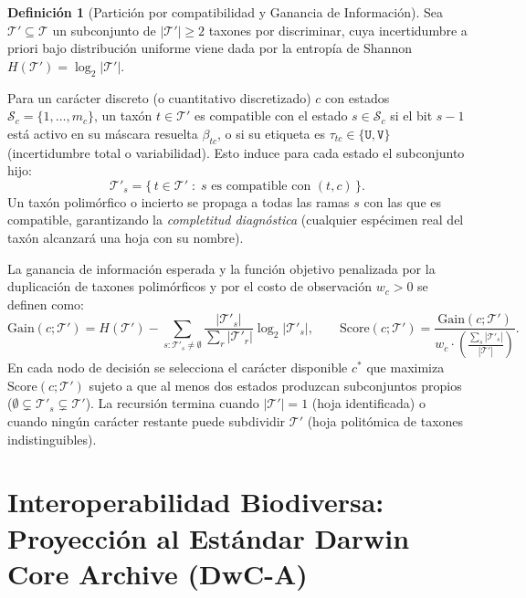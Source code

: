 \documentclass[11pt,a4paper]{article}
\theoremstyle{definition}
\newtheorem{definicion}{Definición}[section]
\theoremstyle{remark}
\begin{document}
\begin{definicion}[Partición por compatibilidad y Ganancia de Información]
Sea $\mathcal{T}' \subseteq \mathcal{T}$ un subconjunto de $|\mathcal{T}'| \ge 2$ taxones por discriminar, cuya incertidumbre a priori bajo distribución uniforme viene dada por la entropía de Shannon $H(\mathcal{T}') = \log_2 |\mathcal{T}'|$.

Para un carácter discreto (o cuantitativo discretizado) $c$ con estados $\mathcal{S}_c = \{1, \dots, m_c\}$, un taxón $t \in \mathcal{T}'$ es compatible con el estado $s \in \mathcal{S}_c$ si el bit $s-1$ está activo en su máscara resuelta $\beta_{tc}$, o si su etiqueta es $\tau_{tc} \in \{\texttt{U}, \texttt{V}\}$ (incertidumbre total o variabilidad). Esto induce para cada estado el subconjunto hijo:
\begin{equation}
\label{eq:key_subset}
\mathcal{T}'_s = \big\{\, t \in \mathcal{T}' \;:\; s \text{ es compatible con } (t, c) \,\big\}.
\end{equation}
Un taxón polimórfico o incierto se propaga a todas las ramas $s$ con las que es compatible, garantizando la \emph{completitud diagnóstica} (cualquier espécimen real del taxón alcanzará una hoja con su nombre).

La ganancia de información esperada y la función objetivo penalizada por la duplicación de taxones polimórficos y por el costo de observación $w_c > 0$ se definen como:
\begin{equation}
\label{eq:key_score}
\mathrm{Gain}(c; \mathcal{T}') = H(\mathcal{T}') - \sum_{s : \mathcal{T}'_s \neq \emptyset} \frac{|\mathcal{T}'_s|}{\sum_{r} |\mathcal{T}'_r|} \log_2 |\mathcal{T}'_s|, \qquad \mathrm{Score}(c; \mathcal{T}') = \frac{\mathrm{Gain}(c; \mathcal{T}')}{w_c \cdot \left( \frac{\sum_s |\mathcal{T}'_s|}{|\mathcal{T}'|} \right)}.
\end{equation}
En cada nodo de decisión se selecciona el carácter disponible $c^*$ que maximiza $\mathrm{Score}(c; \mathcal{T}')$ sujeto a que al menos dos estados produzcan subconjuntos propios ($\emptyset \subsetneq \mathcal{T}'_s \subsetneq \mathcal{T}'$). La recursión termina cuando $|\mathcal{T}'| = 1$ (hoja identificada) o cuando ningún carácter restante puede subdividir $\mathcal{T}'$ (hoja politómica de taxones indistinguibles).
\end{definicion}

\section{Interoperabilidad Biodiversa: Proyección al Estándar Darwin Core Archive (DwC-A)}
\label{sec:dwca}
\end{document}
